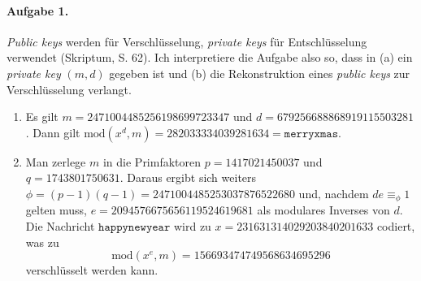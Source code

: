 \documentclass{article}
\newcommand{\cmod}{\text{mod}}
\begin{document}
\paragraph{Aufgabe 1.}

\emph{Public keys} werden f\"ur Verschl\"usselung, \emph{private keys} f\"ur Entschl\"usselung verwendet (Skriptum, S. 62). Ich interpretiere die Aufgabe also so, dass in (a) ein \emph{private key} $(m, d)$ gegeben ist und (b) die Rekonstruktion eines \emph{public keys} zur Verschl\"usselung verlangt.

\begin{enumerate}
    \item Es gilt $m = 2471004485256198699723347$ und $d = 679256688868919115503281$. Dann gilt $\cmod(x^d, m) = 282033334039281634 = \texttt{merryxmas}$.
    
    \item Man zerlege $m$ in die Primfaktoren $p = 1417021450037$ und $q = 1743801750631$. Daraus ergibt sich weiters $\phi = (p - 1)(q - 1) = 2471004485253037876522680$ und, nachdem $de \equiv_{\phi} 1$ gelten muss, $e = 2094576675656119524619681$ als modulares Inverses von $d$. Die Nachricht $\texttt{happynewyear}$ wird zu $x = 231631314029203840201633$ codiert, was zu
    \begin{equation*}
        \cmod(x^e, m) = 156693474749568634695296
    \end{equation*}
    verschlüsselt werden kann.
\end{enumerate}



\end{document}

